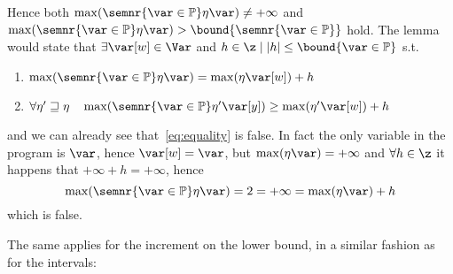 \begin{remark}
  \noindent
  Hence both
  \(\max({\semnr{\var\in\mathbb{P}}\eta\var}) \neq +\infty\) and
  \(\max({\semnr{\var\in\mathbb{P}}\eta\var}) >
  \bound{\semnr{\var\in\mathbb{P}}}\) hold. The lemma would state that
  \(\exists \var[w] \in \Var\) and
  \(h \in \z \mid |h| \leq \bound{\var\in\mathbb{P}}\) s.t.
  \begin{enumerate}[label=(\roman*)]
  \item\label{eq:equality}
    \(\max(\semnr{\var\in \mathbb{P}}\eta\var) = \max(\eta\var[w]) + h\)
  \item
    \(\forall \eta'\sqsupseteq \eta \quad
    \max(\semnr{\var\in\mathbb{P}}\eta'\var[y]) \geq
    \max(\eta'\var[w]) + h\)
  \end{enumerate}
  and we can already see that~\ref{eq:equality} is false. In fact the
  only variable in the program is \(\var\), hence \(\var[w] = \var\),
  but \(\max(\eta\var) = +\infty\) and \(\forall h \in \z\) it happens
  that \(+\infty + h = +\infty\), hence
  \begin{equation*}
    \max(\semnr{\var\in\mathbb{P}}\eta\var) = 2 = +\infty = \max(\eta\var) + h
  \end{equation*}
  which is false.

\end{remark}

The same applies for the increment on the lower bound, in a similar
fashion as for the intervals:


